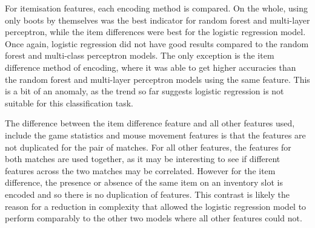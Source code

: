 \documentclass[Report.tex]{subfiles}
\begin{document}
For itemisation features, each encoding method is compared. On the whole, using only boots by themselves was the best indicator for random forest and multi-layer perceptron, while the item differences were best for the logistic regression model. Once again, logistic regression did not have good results compared to the random forest and multi-class perceptron models. The only exception is the item difference method of encoding, where it was able to get higher accuracies than the random forest and multi-layer perceptron models using the same feature. This is a bit of an anomaly, as the trend so far suggests logistic regression is not suitable for this classification task. 

The difference between the item difference feature and all other features used, include the game statistics and mouse movement features is that the features are not duplicated for the pair of matches. For all other features, the features for both matches are used together, as it may be interesting to see if different features across the two matches may be correlated. However for the item difference, the presence or absence of the same item on an inventory slot is encoded and so there is no duplication of features. This contrast is likely the reason for a reduction in complexity that allowed the logistic regression model to perform comparably to the other two models where all other features could not.
\end{document}

